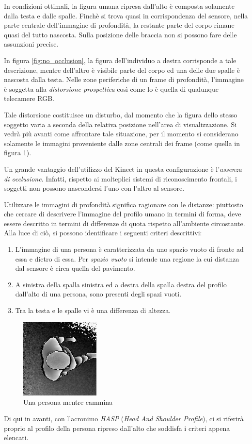 In condizioni ottimali, la figura umana ripresa dall'alto è composta solamente dalla testa e dalle spalle.
Finchè si trova quasi in corrispondenza del sensore, nella parte centrale dell'immagine di profondità, la restante parte del corpo rimane quasi del tutto nascosta. Sulla posizione delle braccia non si possono fare delle assunzioni precise.

In figura \ref{fig:no_occlusion}, la figura dell'individuo a destra corrisponde a tale descrizione, mentre dell'altro è visibile parte del corpo ed una delle due spalle è nascosta dalla testa.
Nelle zone periferiche di un frame di profondità, l'immagine è soggetta alla \emph{distorsione prospettica} così come lo è quella di qualunque telecamere RGB.

Tale distorsione costituisce un disturbo, dal momento che la figura dello stesso soggetto varia a seconda della relativa posizione nell'area di visualizzazione.
Si vedrà più avanti come affrontare tale situazione, per il momento si considerano solamente le immagini proveniente dalle zone centrali dei frame (come quella in figura \ref{fig:spatial_feature}).

Un grande vantaggio dell'utilizzo del Kinect in questa configurazione è l'\emph{assenza di occlusione}.
Infatti, rispetto ai molteplici sistemi di riconoscimento frontali, i soggetti non possono nascondersi l'uno con l'altro al sensore.

Utilizzare le immagini di profondità significa ragionare con le distanze: piuttosto che cercare di descrivere l'immagine del profilo umano in termini di forma, deve essere descritto in termini di differenze di quota rispetto all'ambiente circostante.
Alla luce di ciò, si possono identificare i seguenti criteri descrittivi:

\begin{enumerate}
    \item L'immagine di una persona è caratterizzata da uno spazio vuoto di fronte ad essa e dietro di essa. Per \emph{spazio vuoto} si intende una regione la cui distanza dal sensore è circa quella del pavimento.
    \item A sinistra della spalla sinistra ed a destra della spalla destra del profilo dall'alto di una persona, sono presenti degli spazi vuoti.
    \item Tra la testa e le spalle vi è una differenza di altezza.

\end{enumerate}

\begin{figure}
    \centering
    \includegraphics[width=4cm]{img/spatial_features.png}
    \caption{Una persona mentre cammina}
    \label{fig:spatial_feature}
\end{figure}

Di qui in avanti, con l'acronimo \emph{HASP} (\emph{Head And Shoulder Profile}), ci si riferirà proprio al profilo della persona ripreso dall'alto che soddisfa i criteri appena elencati.

